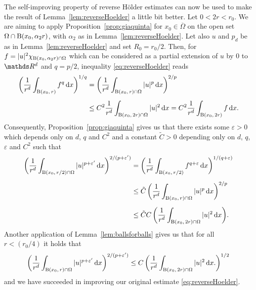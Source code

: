   \begin{rem}
    \label{rem:reverseHoelder}
    The self-improving property of reverse Hölder estimates can now be used to make the result of Lemma~\ref{lem:reverseHoelder} a little bit better. 
    Let $0 < 2r < r_0$.
    We are aiming to apply Proposition~\ref{prop:giaquinta} for $x_0 \in \overline\Omega$ on the open set $\Omega \cap \mathrm{B}(x_0, \alpha_2 r)$, with $\alpha_2$ as in Lemma~\ref{lem:reverseHoelder}.
    Let also $u$ and $p_d$ be as in Lemma~\ref{lem:reverseHoelder} and set $R_0 = r_0/2$. 
    Then, for $f = |u|^{2} \chi_{\mathrm{B}(x_0,\,\alpha_2 r) \cap \Omega}$ which can be considered as a partial extension of $u$ by $0$ to $\R^d$ and $q = p/2$, inequality \eqref{eq:reverseHoelder} reads
    \begin{align*}
      \bigg( \frac{1}{r^d} \int_{\mathrm{B}(x_0,\, r)} f^q \, {\operatorname{d}\!{x}} \bigg)^{1/q}
      &= \bigg( \frac{1}{r^d} \int_{\mathrm{B}(x_0,\, r) \cap \Omega} |u|^p \, {\operatorname{d}\!{x}} \bigg)^{2/p} \\[0.5em]
      &\leq C^2 \frac{1}{r^d} \int_{\mathrm{B}(x_0,\, 2r) \cap \Omega} |u|^2 \, {\operatorname{d}\!{x}}
      = C^2 \frac{1}{r^d} \int_{\mathrm{B}(x_0,\, 2r)} f \, {\operatorname{d}\!{x}}.
    \end{align*}
    Consequently, Proposition~\ref{prop:giaquinta} gives us that there exists some $\varepsilon > 0$ which depends only on $d$, $q$ and $C^2$ and a constant $\tilde C >0$ depending only on $d$, $q$, $\varepsilon$ and $C^2$ such that
    \begin{align*}
      \bigg( \frac{1}{r^d} \int_{\mathrm{B}(x_0,\, r/2) \cap \Omega} |u|^{p + \varepsilon'}\, {\operatorname{d}\!{x}} \bigg)^{2/(p + \varepsilon ')} 
      &= \bigg( \frac{1}{r^d} \int_{\mathrm{B}(x_0,\, r/2)} f^{q + \varepsilon} \, {\operatorname{d}\!{x}} \bigg)^{1/(q + \varepsilon)} \\[0.5em]
      &\leq \tilde C\, \bigg( \frac{1}{r^d} \int_{\mathrm{B}(x_0,\, r) \cap \Omega} |u|^p \, {\operatorname{d}\!{x}} \bigg)^{2/p} \\[0.5em]
      &\leq \tilde C C\, \bigg( \frac{1}{r^d} \int_{\mathrm{B}(x_0,\,2r)\cap \Omega } |u|^2 \, {\operatorname{d}\!{x}} \bigg).
    \end{align*}
    Another application of Lemma~\ref{lem:ballsforballs} gives us that for all $r < ( r_0/4 )$ it holds that
    \begin{align}
      \label{eq:improvedreverseHoelder}
      \bigg( \frac{1}{r^d} \int_{\mathrm{B}(x_0,\, r) \cap \Omega} |u|^{p + \varepsilon'} \, {\operatorname{d}\!{x}} \bigg)^{2/(p + \varepsilon')}
      \leq C \, \bigg(\frac{1}{r^d} \int_{\mathrm{B}(x_0,\, 2r) \cap \Omega} |u|^2 \, {\operatorname{d}\!{x}}.  \bigg)^{1/2}
    \end{align}
    and we have succeeded in improving our original estimate \eqref{eq:reverseHoelder}.
  \end{rem}

